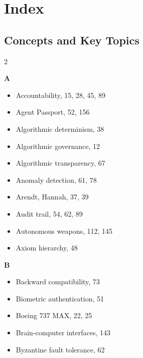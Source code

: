 
\chapter*{Index}

\section*{Concepts and Key Topics}

\begin{multicols}{2}

\textbf{A}
\begin{itemize}[leftmargin=0.5cm]
\item Accountability, 15, 28, 45, 89
\item Agent Passport, 52, 156
\item Algorithmic determinism, 38
\item Algorithmic governance, 12
\item Algorithmic transparency, 67
\item Anomaly detection, 61, 78
\item Arendt, Hannah, 37, 39
\item Audit trail, 54, 62, 89
\item Autonomous weapons, 112, 145
\item Axiom hierarchy, 48
\end{itemize}

\textbf{B}
\begin{itemize}[leftmargin=0.5cm]
\item Backward compatibility, 73
\item Biometric authentication, 51
\item Boeing 737 MAX, 22, 25
\item Brain-computer interfaces, 143
\item Byzantine fault tolerance, 62
\end{itemize}


\end{multicols}
